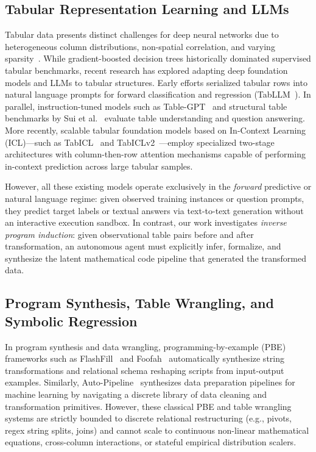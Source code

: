 \documentclass[sigconf]{acmart}
\begin{document}
\subsection{Tabular Representation Learning and LLMs}
Tabular data presents distinct challenges for deep neural networks due to heterogeneous column distributions, non-spatial correlation, and varying sparsity~\cite{borisov2022deep,grinsztajn2022tree}. While gradient-boosted decision trees historically dominated supervised tabular benchmarks, recent research has explored adapting deep foundation models and LLMs to tabular structures. Early efforts serialized tabular rows into natural language prompts for forward classification and regression (TabLLM~\cite{hegselmann2023tabllm}). In parallel, instruction-tuned models such as Table-GPT~\cite{li2024tablegpt} and structural table benchmarks by Sui et al.~\cite{sui2024table} evaluate table understanding and question answering. More recently, scalable tabular foundation models based on In-Context Learning (ICL)—such as TabICL~\cite{qu2025tabicl} and TabICLv2~\cite{qu2026tabiclv2}—employ specialized two-stage architectures with column-then-row attention mechanisms capable of performing in-context prediction across large tabular samples. 

However, all these existing models operate exclusively in the \emph{forward} predictive or natural language regime: given observed training instances or question prompts, they predict target labels or textual answers via text-to-text generation without an interactive execution sandbox. In contrast, our work investigates \emph{inverse program induction}: given observational table pairs before and after transformation, an autonomous agent must explicitly infer, formalize, and synthesize the latent mathematical code pipeline that generated the transformed data.

\subsection{Program Synthesis, Table Wrangling, and Symbolic Regression}
In program synthesis and data wrangling, programming-by-example (PBE) frameworks such as FlashFill~\cite{gulwani2011flashfill} and Foofah~\cite{jin2017foofah} automatically synthesize string transformations and relational schema reshaping scripts from input-output examples. Similarly, Auto-Pipeline~\cite{yang2021autopipeline} synthesizes data preparation pipelines for machine learning by navigating a discrete library of data cleaning and transformation primitives. However, these classical PBE and table wrangling systems are strictly bounded to discrete relational restructuring (e.g., pivots, regex string splits, joins) and cannot scale to continuous non-linear mathematical equations, cross-column interactions, or stateful empirical distribution scalers.
\end{document}

